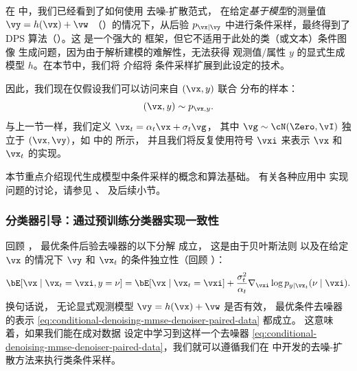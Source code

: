 \documentclass[../../book-main_zh.tex]{subfiles}
\begin{document}
在  中，我们已经看到了如何使用
去噪-扩散范式，
在给定\textit{基于模型}的测量值 $\vy = h(\vx) + \vw$
（）的情况下，从后验 $p_{\vx \mid \vy}$ 中进行条件采样，最终得到了
DPS 算法（）。这
是一个强大的
框架，但它不适用于此处的类（或文本）条件图像
生成问题，因为由于解析建模的难解性，无法获得
观测值/属性 $y$ 的显式生成模型 $h$。在本节中，我们将
介绍将
条件采样扩展到此设定的技术。

因此，我们现在仅假设我们可以访问来自 $(\vx, y)$ 联合
分布的样本：
\begin{equation}
    (\vx, y) \sim p_{\vx, y}.
\end{equation}
与上一节一样，我们定义 $\vx_t = \alpha_t \vx + \sigma_t \vg$，
其中 $\vg \sim \cN(\Zero, \vI)$ 独立于 $(\vx, \vy)$，如
 中的  所示，
并且我们将反复使用符号 $\vxi$ 来表示 $\vx$
和 $\vx_t$ 的实现。

本节重点介绍现代生成模型中条件采样的概念和算法基础。
有关各种应用中
实现问题的讨论，请参见 、
 及后续小节。

\subsubsection{分类器引导：通过预训练分类器实现一致性}

回顾 ，
最优条件后验去噪器的以下分解
成立，
这是由于贝叶斯法则
以及在给定 $\vx$ 的情况下 $\vy$ 和 $\vx_t$ 的条件独立性（回顾
）：
\begin{equation}\label{eq:conditional-denoising-mmse-denoiser-paired-data}
    \bE[ \vx \mid \vx_t=\vxi, y=\nu]
    =
    \bE[\vx \mid \vx_t=\vxi]
    + \frac{\sigma_t^2}{\alpha_t}
    \nabla_{\vxi}\log p_{y \mid \vx_t}(\nu\mid \vxi).
\end{equation}
换句话说，
无论显式观测模型 $\vy = h(\vx) + \vw$ 是否有效，
最优条件去噪器的表示
\eqref{eq:conditional-denoising-mmse-denoiser-paired-data} 都成立。
这意味着，如果我们能在成对数据
设定中学习到这样一个去噪器 \eqref{eq:conditional-denoising-mmse-denoiser-paired-data}，我们就可以遵循我们在
 中开发的去噪-扩散方法来执行类条件采样。
\end{document}
